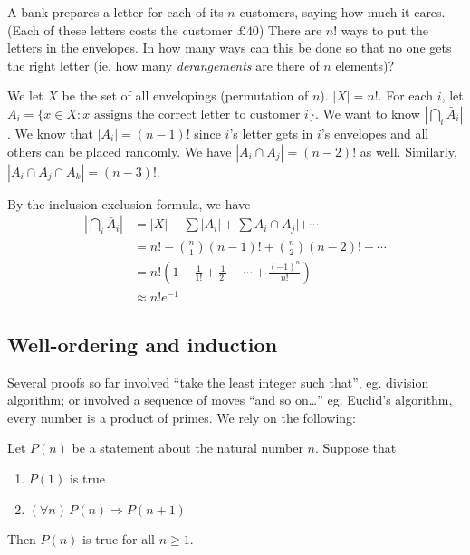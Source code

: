 \documentclass[a4paper]{article}
\begin{document}
\begin{eg}
  A bank prepares a letter for each of its $n$ customers, saying how much it cares. (Each of these letters costs the customer $\pounds 40$) There are $n!$ ways to put the letters in the envelopes. In how many ways can this be done so that no one gets the right letter (ie. how many \emph{derangements} are there of $n$ elements)?

  We let $X$ be the set of all envelopings (permutation of $n$). $|X| = n!$. For each $i$, let $A_i = \{x\in X: x \text{ assigns the correct letter to customer }i\}$. We want to know $|\bigcap_i \bar A_i|$. We know that $|A_i| = (n - 1)!$ since $i$'s letter gets in $i$'s envelopes and all others can be placed randomly. We have $|A_i\cap A_j| = (n - 2)!$ as well. Similarly, $|A_i\cap A_j \cap A_k| = (n - 3)!$.

  By the inclusion-exclusion formula, we have
  \begin{align*}
    \left|\bigcap_i \bar A_i\right| &= |X| - \sum |A_i| + \sum A_i\cap A_j| + \cdots\\
    &= n! - \binom{n}{1}(n - 1)! + \binom{n}{2}(n - 2)! - \cdots\\
    &= n!\left(1 - \frac{1}{1!} + \frac{1}{2!} - \cdots + \frac{(-1)^n}{n!}\right)\\
    &\approx n! e^{-1}
  \end{align*}
\end{eg}
\subsection{Well-ordering and induction}
Several proofs so far involved ``take the least integer such that'', eg. division algorithm; or involved a sequence of moves ``and so on\ldots'' eg. Euclid's algorithm, every number is a product of primes. We rely on the following:
\begin{thm}
  Let $P(n)$ be a statement about the natural number $n$. Suppose that
  \begin{enumerate}
    \item $P(1)$ is true
    \item $(\forall n)\,P(n)\Rightarrow P(n + 1)$
  \end{enumerate}
  Then $P(n)$ is true for all $n\geq 1$.
\end{thm}
\end{document}
